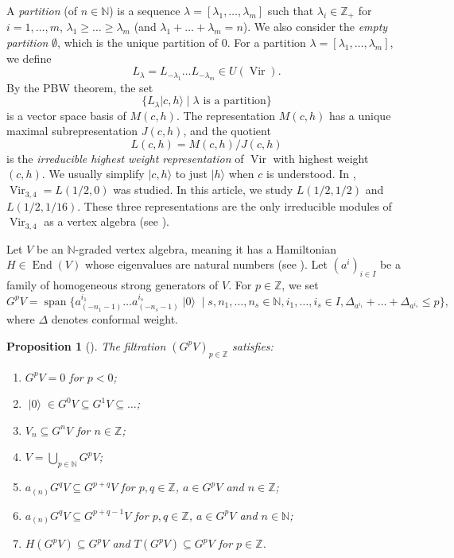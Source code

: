 \documentclass[a4paper, 12pt, reqno]{amsart}
\newtheorem{proposition}[theorem]{Proposition}
\theoremstyle{remark}
\DeclareMathOperator{\Vir}{Vir}
\DeclareMathOperator{\End}{End}
\DeclareMathOperator{\vspan}{span}
\DeclareMathOperator{\vac}{|0\rangle}
\begin{document}
A \emph{partition} (of $n \in \mathbb{N}$) is a sequence $\lambda = [\lambda_1, \dots, \lambda_m]$ such that $\lambda_i \in \mathbb{Z}_+$ for $i = 1, \dots, m$, $\lambda_1 \ge \dots \ge \lambda_m$ (and $\lambda_1 + \dots + \lambda_m = n$).
We also consider the \emph{empty partition} $\emptyset$, which is the unique partition of $0$.
For a partition $\lambda = [\lambda_1, \dots, \lambda_m]$, we define
\begin{equation*}
  L_{\lambda} = L_{-\lambda_1}\dots L_{-\lambda_m} \in U(\Vir).
\end{equation*}
By the PBW theorem, the set
\begin{equation*}
  \{L_{\lambda}|c, h\rangle \mid \text{$\lambda$ is a partition}\}
\end{equation*}
is a vector space basis of $M(c, h)$.
The representation $M(c, h)$ has a unique maximal subrepresentation $J(c, h)$, and the quotient
\begin{equation*}
  L(c, h) = M(c, h)/J(c, h)
\end{equation*}
is the \emph{irreducible highest weight representation} of $\Vir$ with highest weight $(c, h)$.
We usually simplify $|c, h\rangle$ to just $|h\rangle$ when $c$ is understood.
In \cite{andrews_singular_2022}, $\Vir_{3, 4} = L(1/2, 0)$ was studied.
In this article, we study $L(1/2, 1/2)$ and $L(1/2, 1/16)$.
These three representations are the only irreducible modules of $\Vir_{3, 4}$ as a vertex algebra (see \cite[Theorem 4.2]{wang_rationality_1993}).

Let $V$ be an $\mathbb{N}$-graded vertex algebra, meaning it has a Hamiltonian $H \in \End(V)$ whose eigenvalues are natural numbers (see \cite[\S1.6]{de_sole_finite_2006}).
Let $(a^i)_{i \in I}$ be a family of homogeneous strong generators of $V$.
For $p \in \mathbb{Z}$, we set
\begin{equation*}
  G^pV = \vspan\{a^{i_1}_{(-n_1 - 1)}\dots a^{i_s}_{(-n_s - 1)}\vac \mid s, n_1, \dots, n_s \in \mathbb{N}, i_1, \dots, i_s \in I, \Delta_{a^{i_1}} + \dots + \Delta_{a^{i_s}} \le p\},
\end{equation*}
where $\Delta$ denotes conformal weight.

\begin{proposition}[{\cite{li_vertex_2004}}]
  \label{prp:1}
  The filtration $(G^pV)_{p \in \mathbb{Z}}$ satisfies:
  \begin{enumerate}
  \item $G^pV = 0$ for $p < 0$;
  \item $\vac \in G^0V \subseteq G^1V \subseteq \dots$;
  \item $V_n \subseteq G^nV$ for $n \in \mathbb{Z}$;
  \item $V = \bigcup_{p \in \mathbb{N}}G^pV$;
  \item $a_{(n)}G^qV \subseteq G^{p + q}V$ for $p, q \in \mathbb{Z}$, $a \in G^pV$ and $n \in \mathbb{Z}$;
  \item $a_{(n)}G^qV \subseteq G^{p + q - 1}V$ for $p, q \in \mathbb{Z}$, $a \in G^pV$ and $n \in \mathbb{N}$;
  \item $H(G^pV) \subseteq G^pV$ and $T(G^pV) \subseteq G^pV$ for $p \in \mathbb{Z}$.
  \end{enumerate}
\end{proposition}
\end{document}
